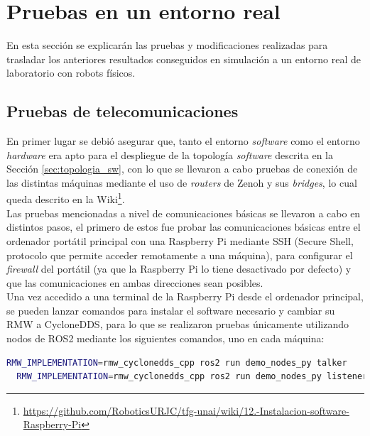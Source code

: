\section{Pruebas en un entorno real}
\label{sec:pruebas_real}

En esta sección se explicarán las pruebas y modificaciones realizadas para
trasladar los anteriores resultados conseguidos en simulación a un entorno real
de laboratorio con robots físicos.
\\

\subsection{Pruebas de telecomunicaciones}
\label{sec:pruebas_telecoms}

En primer lugar se debió asegurar que, tanto el entorno \textit{software} como
el entorno \textit{hardware} era apto para el despliegue de la topología
\textit{software} descrita en la Sección \ref{sec:topologia_sw}, con lo que se
llevaron a cabo pruebas de conexión de las distintas máquinas mediante el uso de
\textit{routers} de Zenoh y sus \textit{bridges}, lo cual queda descrito en la
Wiki\footnote{
\href{https://github.com/RoboticsURJC/tfg-unai/wiki/12.-Instalaci\%C3\%B3n-del-software-en-Raspberry-Pi--\%5B9-Nov-\%E2\%80\%90-18-Nov\%5D}{https://github.com/RoboticsURJC/tfg-unai/wiki/12.-Instalacion-software-Raspberry-Pi}}.
\\

Las pruebas mencionadas a nivel de comunicaciones básicas se llevaron a cabo
en distintos pasos, el primero de estos fue probar las comunicaciones básicas
entre el ordenador portátil principal con una Raspberry Pi mediante SSH (Secure
Shell, protocolo que permite acceder remotamente a una máquina), para configurar
el \textit{firewall} del portátil (ya que la Raspberry Pi lo tiene desactivado por
defecto) y que las comunicaciones en ambas direcciones sean posibles.
\\

Una vez accedido a una terminal de la Raspberry Pi desde el ordenador principal,
se pueden lanzar comandos para instalar el software necesario y cambiar su RMW a
CycloneDDS, para lo que se realizaron pruebas únicamente utilizando nodos de
ROS2 mediante los siguientes comandos, uno en cada máquina:
\begin{lstlisting}[language=bash]
  RMW_IMPLEMENTATION=rmw_cyclonedds_cpp ros2 run demo_nodes_py talker
  RMW_IMPLEMENTATION=rmw_cyclonedds_cpp ros2 run demo_nodes_py listener
\end{lstlisting}

